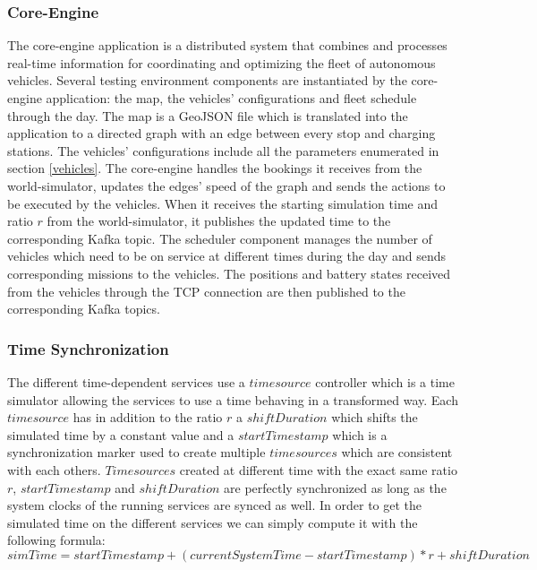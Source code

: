 \documentclass[12pt,a4paper]{article}
\begin{document}
\subsubsection{Core-Engine}
The core-engine application is a distributed system that combines and processes real-time information for coordinating and optimizing the fleet of autonomous vehicles. Several testing environment components are instantiated by the core-engine application: the map, the vehicles' configurations and fleet schedule through the day. The map is a GeoJSON file which is translated into the application to a directed graph with an edge between every stop and charging stations. The vehicles' configurations include all the parameters enumerated in section \ref{vehicles}. The core-engine handles the bookings it receives from the world-simulator, updates the edges' speed of the graph and sends the actions to be executed by the vehicles. When it receives the starting simulation time and ratio $r$ from the world-simulator, it publishes the updated time to the corresponding Kafka topic. The scheduler component manages the number of vehicles which need to be on service at different times during the day and sends corresponding missions to the vehicles. The positions and battery states received from the vehicles through the TCP connection are then published to the corresponding Kafka topics.  

\subsubsection{Time Synchronization}
The different time-dependent services use a $timesource$ controller which is a time simulator allowing the services to use a time behaving in a transformed way. Each $timesource$ has in addition to the ratio $r$ a $shift Duration$ which shifts the simulated time by a constant value and a $start Timestamp$ which is a  synchronization marker used to create multiple $timesources$ which are consistent with each others. $Timesources$ created at different time with the exact same ratio $r$, $start Timestamp$ and $shift Duration$ are perfectly synchronized as long as the system clocks of the running services are synced as well. In order to get the simulated time on the different services we can simply compute it with the following formula:
$$simTime = start Timestamp + (current System Time - start Timestamp) * r + shift Duration$$
\end{document}
